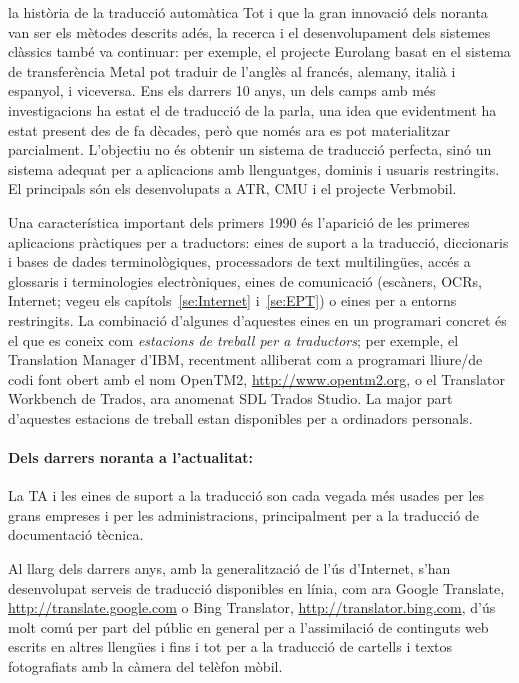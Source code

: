 \begin{persabermes}{la història de la traducció automàtica}
Tot i que la gran innovació dels noranta van ser els mètodes descrits
adés, la recerca i el desenvolupament dels sistemes clàssics també va
continuar: per exemple, el projecte Eurolang basat en el sistema de
transferència Metal pot traduir de l'anglès al francés, alemany,
italià i espanyol, i viceversa.  Ens els darrers 10 anys, un dels
camps amb més investigacions ha estat el de traducció de la parla, una
idea que evidentment ha estat present des de fa dècades, però que
només ara es pot materialitzar parcialment.  L'objectiu no és obtenir
un sistema de traducció perfecta, sinó un sistema adequat per a
aplicacions amb llenguatges, dominis i usuaris restringits. El
principals són els desenvolupats a ATR, CMU i el projecte Verbmobil.

Una característica important dels primers 1990 és l'aparició de les
primeres aplicacions pràctiques per a traductors: eines de suport a la
traducció, diccionaris i bases de dades terminològiques, processadors
de text multilingües, accés a glossaris i terminologies electròniques,
eines de comunicació (escàners, OCRs, Internet; vegeu els
capítols~\ref{se:Internet} i~\ref{se:EPT}) o eines per a entorns
restringits.  La combinació d'algunes d'aquestes eines en un
programari concret és el que es coneix com \emph{estacions de treball
  per a traductors}; per exemple, el Translation Manager d'IBM,
recentment alliberat com a programari lliure/de codi font obert amb el
nom OpenTM2, \url{http://www.opentm2.org}, o el Translator Workbench
de Trados, ara anomenat SDL Trados Studio. La major part d'aquestes estacions
de treball estan disponibles per a ordinadors personals.

\paragraph{Dels darrers noranta a l'actualitat:}

La TA i les eines de suport a la traducció son cada vegada més usades
per les grans empreses i per les administracions, principalment per a
la traducció de documentació tècnica.

Al llarg dels darrers anys, amb la generalització de l'ús d'Internet,
s'han desenvolupat serveis de traducció disponibles en línia, com ara
Google Translate, \url{http://translate.google.com} o Bing Translator,
\url{http://translator.bing.com}, d'ús molt comú per part del públic
en general per a l'assimilació de continguts web escrits en altres
llengües i fins i tot per a la traducció de cartells i textos
fotografiats amb la càmera del telèfon mòbil.


\end{persabermes}
